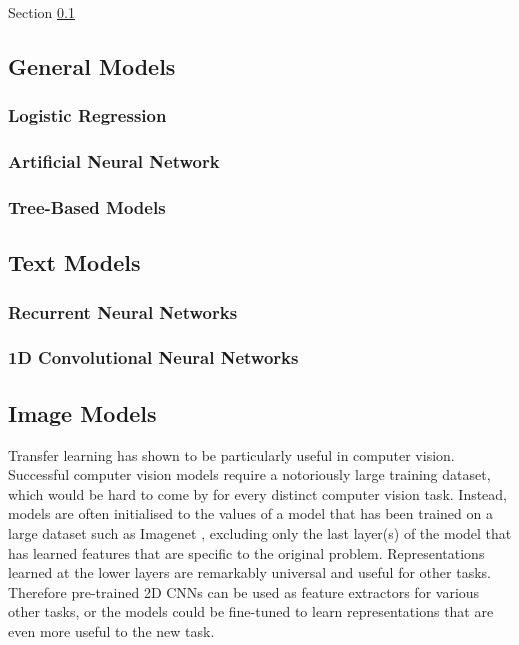 Section \ref{general_models}

\subsection{General Models}
\label{general_models}

\subsubsection{Logistic Regression}
\subsubsection{Artificial Neural Network}
\subsubsection{Tree-Based Models}

\subsection{Text Models}
\label{text_models}

\subsubsection{Recurrent Neural Networks}
\label{rnn}

\subsubsection{1D Convolutional Neural Networks}

\subsection{Image Models}
\label{image_models}

Transfer learning has shown to be particularly useful in computer vision.
Successful computer vision models require a notoriously large training dataset, which would be hard to come by for every distinct computer vision task.
Instead, models are often initialised to the values of a model that has been trained on a large dataset such as Imagenet \cite{}, excluding only the last layer(s) of the model that has learned features that are specific to the original problem.
Representations learned at the lower layers are remarkably  universal and useful for other tasks.
Therefore pre-trained 2D CNNs can be used as feature extractors for various other tasks,  or the models could be fine-tuned to learn representations that are even more useful to the new task.

